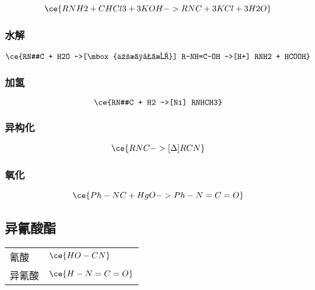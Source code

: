 \begin{equation*}
    \ce{RNH2 + CHCl3 + 3KOH -> RNC + 3KCl + 3H2O}
\end{equation*}



\subsubsection{水解}

\begin{equation*}
    \ce{RN#C + H2O ->[\mbox{亲核加成}] R-NH=C-OH ->[H+] RNH2 + HCOOH}
\end{equation*}

\subsubsection{加氢}
\begin{equation*}
    \ce{RN#C + H2 ->[Ni] RNHCH3}
\end{equation*}

\subsubsection{异构化}
\begin{equation*}
    \ce{RNC ->[\Delta] RCN}
\end{equation*}
\subsubsection{氧化}

\begin{equation*}
    \ce{Ph-NC + HgO -> Ph-N=C=O}
\end{equation*}

\subsection{异氰酸酯}

\begin{table}[h]
    \centering
    \begin{tabular}{ll}
        氰酸   & $\ce{HO-CN}$   \\
        异氰酸 & $\ce{H-N=C=O}$ \\
    \end{tabular}
\end{table}

